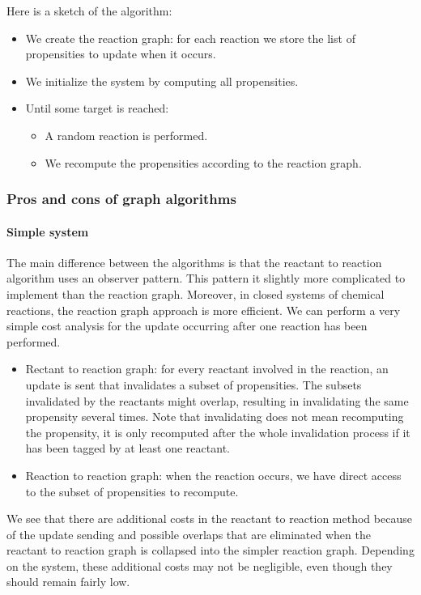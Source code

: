 Here is a sketch of the algorithm:
\begin{itemize}
  \item We create the reaction graph:
  for each reaction we store the list of propensities to update when it occurs.
  \item We initialize the system by computing all propensities.
  \item Until some target is reached:
    \begin{itemize}
      \item A random reaction is performed.
      \item We recompute the propensities according to the reaction graph.
    \end{itemize}
\end{itemize}


\subsubsection{Pros and cons of graph algorithms}

\paragraph{Simple system}
The main difference between the algorithms is that the reactant to reaction algorithm uses an observer pattern.
This pattern it slightly more complicated to implement than the reaction graph.
Moreover, in closed systems of chemical reactions, the reaction graph approach is more efficient.
We can perform a very simple cost analysis for the update occurring after one reaction has been performed.
\begin{itemize}
  \item Rectant to reaction graph: for every reactant involved in the reaction, an update is sent that invalidates a subset of propensities.
  The subsets invalidated by the reactants might overlap, resulting in invalidating the same propensity several times.
  Note that invalidating does not mean recomputing the propensity,
  it is only recomputed after the whole invalidation process if it has been tagged by at least one reactant.
  \item Reaction to reaction graph: when the reaction occurs, we have direct access to the subset of propensities to recompute.
\end{itemize}

We see that there are additional costs in the reactant to reaction method
because of the update sending and possible overlaps that are eliminated
when the reactant to reaction graph is collapsed into the simpler reaction graph.
Depending on the system, these additional costs may not be negligible, even though they should remain fairly low.

